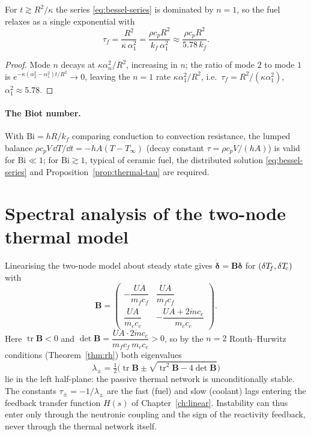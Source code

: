 \begin{proposition}
\label{prop:thermal-tau}
For $t\gtrsim R^2/\kappa$ the series \eqref{eq:bessel-series} is dominated by $n=1$,
so the fuel relaxes as a single exponential with
\begin{equation}
\tau_f=\frac{R^2}{\kappa\,\alpha_1^2}=\frac{\rho c_p R^2}{k_f\,\alpha_1^2}
\approx\frac{\rho c_p R^2}{5.78\,k_f}.
\end{equation}
\end{proposition}
\begin{proof}
Mode $n$ decays at $\kappa\alpha_n^2/R^2$, increasing in $n$; the ratio of mode $2$
to mode $1$ is $e^{-\kappa(\alpha_2^2-\alpha_1^2)t/R^2}\to0$, leaving the $n=1$
rate $\kappa\alpha_1^2/R^2$, i.e.\ $\tau_f=R^2/(\kappa\alpha_1^2)$,
$\alpha_1^2\approx5.78$.
\end{proof}

\paragraph{The Biot number.}
With $\mathrm{Bi}=hR/k_f$ comparing conduction to convection resistance, the
lumped balance $\rho c_p V\,\dd T/\dd t=-hA(T-T_\infty)$ (decay constant
$\tau=\rho c_p V/(hA)$) is valid for $\mathrm{Bi}\ll1$; for $\mathrm{Bi}\gtrsim1$,
typical of ceramic fuel, the distributed solution \eqref{eq:bessel-series} and
Proposition~\ref{prop:thermal-tau} are required.

\section{Spectral analysis of the two-node thermal model}
\label{sec:twonode-spectral}

Linearising the two-node model about steady state gives $\dot{\boldsymbol\delta}
=\mathbf B\boldsymbol\delta$ for $(\delta T_{\!f},\delta T_{\!c})$ with
\begin{equation}
\mathbf B=
\begin{pmatrix}
-\dfrac{U\!A}{m_fc_f} & \dfrac{U\!A}{m_fc_f}\\[6pt]
\dfrac{U\!A}{m_cc_c} & -\dfrac{U\!A+2\dot m c_c}{m_cc_c}
\end{pmatrix}.
\end{equation}
Here $\operatorname{tr}\mathbf B<0$ and
$\det\mathbf B=\dfrac{U\!A\cdot 2\dot m c_c}{m_fc_f\,m_cc_c}>0$, so by the $n=2$
Routh--Hurwitz conditions (Theorem~\ref{thm:rh}) both eigenvalues
\begin{equation}
\lambda_\pm=\tfrac12\Big(\operatorname{tr}\mathbf B\pm
\sqrt{\operatorname{tr}^2\mathbf B-4\det\mathbf B}\Big)
\end{equation}
lie in the left half-plane: the passive thermal network is unconditionally stable.
The constants $\tau_\pm=-1/\lambda_\pm$ are the fast (fuel) and slow (coolant)
lags entering the feedback transfer function $H(s)$ of Chapter~\ref{ch:linear}.
Instability can thus enter only through the neutronic coupling and the sign of the
reactivity feedback, never through the thermal network itself.


